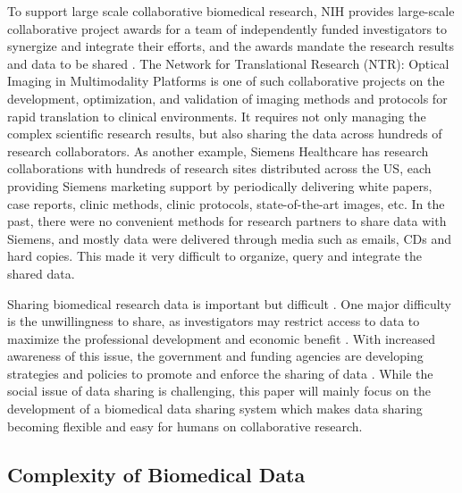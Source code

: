 \documentclass{singlecol-new}
\theoremstyle{TH}{
\newtheorem{lemma}{Lemma}
\newtheorem{theorem}[lemma]{Theorem}
\newtheorem{corrolary}[lemma]{Corrolary}
\newtheorem{conjecture}[lemma]{Conjecture}
\newtheorem{proposition}[lemma]{Proposition}
\newtheorem{claim}[lemma]{Claim}
\newtheorem{stheorem}[lemma]{Wrong Theorem}
\newtheorem{algorithm}{Algorithm}
}
\theoremstyle{THrm}{
\newtheorem{definition}{Definition}[section]
\newtheorem{question}{Question}[section]
\newtheorem{remark}{Remark}
\newtheorem{scheme}{Scheme}
}
\theoremstyle{THhit}{
\newtheorem{case}{Case}[section]
}
\begin{document}
To support large scale collaborative biomedical research, NIH
provides large-scale collaborative project awards  for a team of
independently funded investigators to synergize and integrate their
efforts, and the awards mandate the research results and data to be
shared \cite{nih03datasharing,nih08policy}.  The Network for
Translational Research (NTR): Optical Imaging in Multimodality
Platforms\cite{ntr} is one of such collaborative projects on the
development, optimization, and validation of imaging methods and
protocols for rapid translation to clinical environments.  It
requires not only managing the complex scientific research results,
but also sharing the data across hundreds of research collaborators.
As another example, Siemens Healthcare has research collaborations
with hundreds of research sites distributed across the US, each
providing Siemens marketing support by periodically delivering white
papers, case reports, clinic methods, clinic protocols,
state-of-the-art images, etc. In the past, there were no convenient
methods for research partners to share data with Siemens, and mostly
data were delivered through media such as emails, CDs and hard
copies. This made it very difficult to organize, query and integrate
the shared data.

Sharing biomedical research data is important but difficult
\cite{piwowar08culture,birnholtz03data}. One major difficulty is the
unwillingness to share, as investigators may restrict access to data
to maximize the professional development and economic benefit
\cite{bekelman03}. With increased awareness of this issue, the
government and funding agencies are developing  strategies and
policies to promote and enforce the sharing of data
\cite{piwowar08culture,dsic,cabigconnected}. While the social issue
of data sharing is challenging, this paper will mainly focus on the
development of a biomedical data sharing system which makes data
sharing becoming flexible and easy for humans on collaborative
research.

\subsection{Complexity of Biomedical Data}
\end{document}
